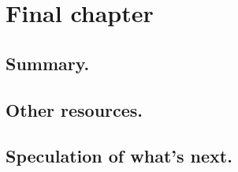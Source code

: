 
\def\ArtDir{09.Final/figures}

\chapter{Final chapter}
\section{Summary.}
\section{Other resources.}
\section{Speculation of what's next.}